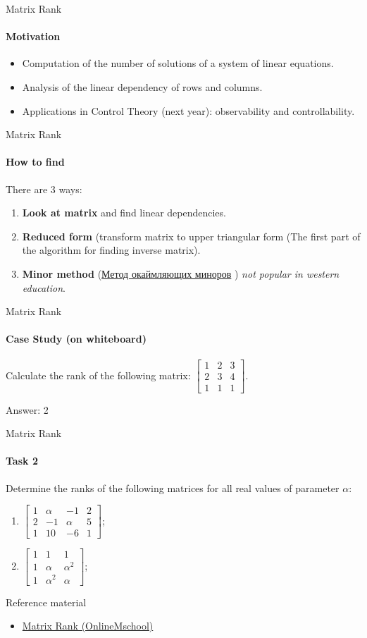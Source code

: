 \documentclass[aspectratio=169]{beamer}
\newcommand{\fbckg}[1]{\usebackgroundtemplate{\texttt{[image: \#1]}}}%
\begin{document}
    \begin{frame}[t]{Matrix Rank}
    \framesubtitle{Motivation}
        \begin{itemize}
            \item Computation of the number of solutions of a system of linear equations.
            \item Analysis of the linear dependency of rows and columns.
            \item Applications in Control Theory (next year): observability and controllability.
        \end{itemize}
    \end{frame}
    
    \begin{frame}[t]{Matrix Rank}
    \framesubtitle{How to find}
        There are 3 ways:
        \begin{enumerate}
            \item \textbf{Look at matrix} and find linear dependencies.
            \item \textbf{Reduced form} (transform matrix to upper triangular form (The first part of the algorithm for finding inverse matrix).
            \item \textbf{Minor method} (\href{http://www.mathprofi.ru/rang_matricy.html}{Метод окаймляющих миноров} ) \textit{not popular in western education}.
        \end{enumerate}
    \end{frame}


\begin{frame}[t]{Matrix Rank}
\framesubtitle{Case Study (on whiteboard)}
Calculate the rank of the following matrix: $\begin{bmatrix}1&2&3\\2&3&4\\1&1&1\end{bmatrix}$. \medskip

\alert{\Large Answer: 2}
\end{frame}

\begin{frame}[t]{Matrix Rank}
\framesubtitle{Task 2}
Determine the ranks of the following matrices for all real values of parameter $\alpha$:
\begin{enumerate}

    \item $\begin{bmatrix}1&\alpha&-1&2\\2&-1&\alpha&5\\1&10&-6&1\end{bmatrix}$;
    \item $\begin{bmatrix}1&1&1\\1&\alpha&\alpha^2\\1&\alpha^2&\alpha\end{bmatrix}$;
\end{enumerate}
\end{frame}


\begin{frame}[t]{Reference material}
    \Large
    \begin{itemize}
        \item \href{https://onlinemschool.com/math/library/matrix/rank/}{Matrix Rank (OnlineMschool)}
    \end{itemize}
\end{frame}

\fbckg{fibeamer/figs/last_page.png}
\frame[plain]{}
\end{document}
